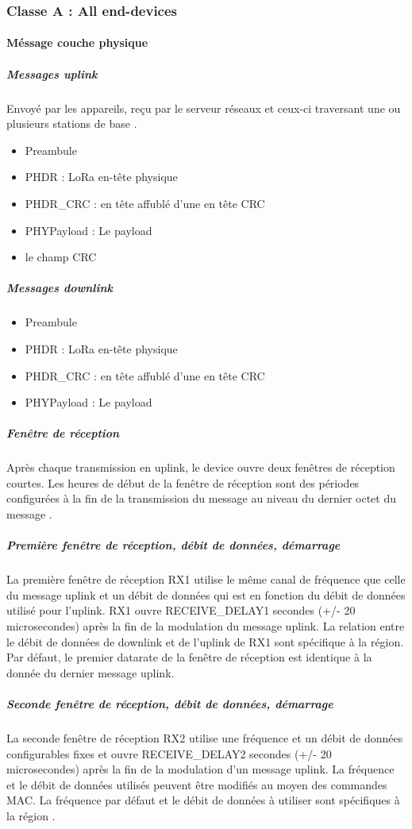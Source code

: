 \documentclass[11pt]{article}
\begin{document}
\newpage
\subsubsection{Classe A : All end-devices}
\paragraph{Méssage couche physique }
\subparagraph{Messages uplink}
Envoyé par les appareils, reçu par le serveur réseaux et ceux-ci traversant une ou plusieurs stations de base .

\begin{itemize}
\item  Preambule
\item  PHDR : LoRa en-tête physique 
\item  PHDR\_CRC : en tête affublé d'une en tête CRC
\item  PHYPayload : Le payload
\item  le champ CRC
\end{itemize}
\subparagraph{Messages downlink}

\begin{itemize}
\item  Preambule
\item  PHDR : LoRa en-tête physique 
\item  PHDR\_CRC : en tête affublé d'une en tête CRC
\item  PHYPayload : Le payload
\end{itemize}
\subparagraph{Fenêtre de réception}

Après chaque transmission en uplink, le device ouvre deux fenêtres de réception courtes. Les heures de début de la fenêtre de réception sont des périodes configurées à la fin de la transmission du message au niveau du dernier octet du message .

\subparagraph{Première fenêtre de réception, débit de données, démarrage}

La première fenêtre de réception RX1 utilise le même canal de fréquence que celle du message uplink et un débit de données qui est en fonction du débit de données utilisé pour l'uplink.
RX1 ouvre RECEIVE\_DELAY1 secondes (+/- 20 microsecondes) après la fin de la modulation du message uplink. La relation entre le débit de données de downlink et de l'uplink de RX1 sont spécifique à la région. Par défaut, le premier datarate de la fenêtre de réception est identique à la donnée du dernier message uplink.

\subparagraph{Seconde fenêtre de réception, débit de données, démarrage}
La seconde fenêtre de réception RX2 utilise une fréquence et un débit de données configurables fixes et ouvre RECEIVE\_DELAY2 secondes (+/- 20 microsecondes) après la fin de la modulation d'un message uplink. La fréquence et le débit de données utilisés peuvent être modifiés au moyen des commandes MAC. La fréquence par défaut et le débit de données à utiliser sont spécifiques à la région .
\end{document}

